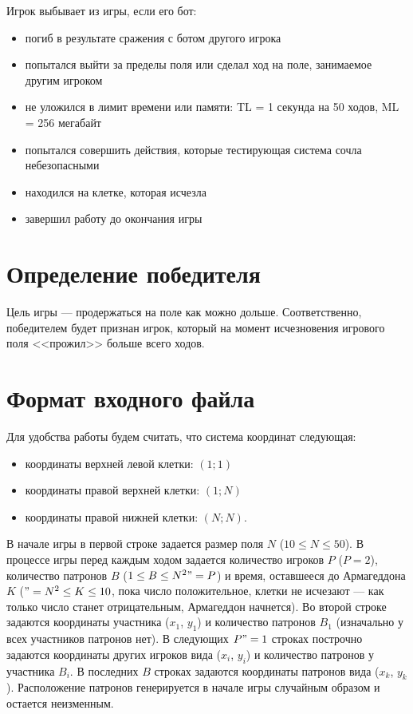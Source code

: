 \documentclass[a4paper,12pt]{article}
\begin{document}
\begin{flushleft}
Игрок выбывает из игры, если его бот:
\begin{itemize}
\item погиб в результате сражения с ботом другого игрока
\item попытался выйти за пределы поля или сделал ход на поле, занимаемое другим игроком
\item не уложился в лимит времени или памяти:
TL = 1 секунда на 50 ходов, ML = 256 мегабайт
\item попытался совершить действия, которые тестирующая система сочла небезопасными
\item находился на клетке, которая исчезла
\item завершил работу до окончания игры
\end{itemize}
\end{flushleft}
\section{Определение победителя}
Цель игры --- продержаться на поле как можно дольше. Соответственно, победителем будет признан игрок, который на момент исчезновения игрового поля <<прожил>> больше всего ходов.

\section{Формат входного файла}
Для удобства работы будем считать, что система координат следующая:
\begin{itemize}
\item координаты верхней левой клетки: $(1;1)$
\item координаты правой верхней клетки: $(1;N)$
\item координаты правой нижней клетки: $(N;N)$.
\end{itemize}

\begin{flushleft}
В начале игры в первой строке задается размер поля $N$ ($10 \leq N \leq 50$). В процессе игры перед каждым ходом задается количество игроков $P$ ($P = 2$), количество патронов $B$ ($1 \leq B \leq N^2"=P$) и время, оставшееся до Армагеддона $K$ ($"=N^2 \leq K \leq 10$, пока число положительное, клетки не исчезают --- как только число станет отрицательным, Армагеддон начнется).
Во второй строке задаются координаты участника ($x_1$, $y_1$) и количество патронов $B_1$ (изначально у всех участников патронов нет).
В следующих $P"=1$ строках построчно задаются координаты других игроков вида ($x_i$, $y_i$) и количество патронов у участника $B_i$.
В последних $B$ строках задаются координаты патронов вида ($x_k$, $y_k$). Расположение патронов генерируется в начале игры случайным образом и остается неизменным.
\end{flushleft}
\end{document}
